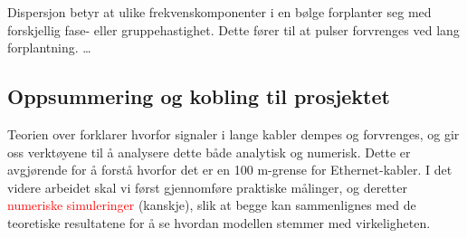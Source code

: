 Dispersjon betyr at ulike frekvenskomponenter i en bølge forplanter seg med forskjellig fase- eller gruppehastighet. Dette fører til at pulser forvrenges ved lang forplantning. 
\dots

\subsection{Oppsummering og kobling til prosjektet}

Teorien over forklarer hvorfor signaler i lange kabler dempes og forvrenges, og gir oss verktøyene til å analysere dette både analytisk og numerisk. Dette er avgjørende for å forstå hvorfor det er en 100 m-grense for Ethernet-kabler. I det videre arbeidet skal vi først gjennomføre praktiske målinger, og deretter \textcolor{red}{numeriske simuleringer} (kanskje), slik at begge kan sammenlignes med de teoretiske resultatene for å se hvordan modellen stemmer med virkeligheten.

